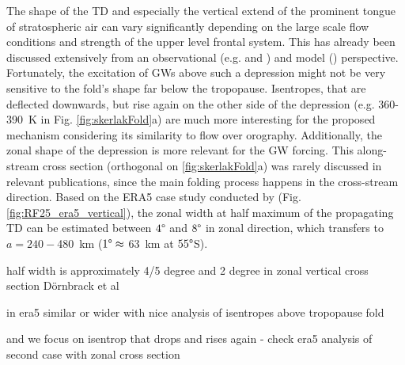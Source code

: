 The shape of the TD and especially the vertical extend of the prominent tongue of stratospheric air can vary significantly depending on the large scale flow conditions and strength of the upper level frontal system. This has already been discussed extensively from an observational (e.g. \cite{shapiro_further_1978} and \cite{keyser_review_1986}) and model (\cite{skerlak_tropopause_2015}) perspective. Fortunately, the excitation of GWs above such a depression might not be very sensitive to the fold's shape far below the tropopause. Isentropes, that are deflected downwards, but rise again on the other side of the depression (e.g. 360-\SI{390}{\kelvin} in Fig. \ref{fig:skerlakFold}a) are much more interesting for the proposed mechanism considering its similarity to flow over orography. Additionally, the zonal shape of the depression is more relevant for the GW forcing. This along-stream cross section (orthogonal on \ref{fig:skerlakFold}a) was rarely discussed in relevant publications, since the main folding process happens in the cross-stream direction. Based on the ERA5 case study conducted by \textcite{dornbrack_stratospheric_2022} (Fig. \ref{fig:RF25_era5_vertical}), the zonal width at half maximum of the propagating TD can be estimated between $4 \degree$ and $8 \degree$ in zonal direction, which transfers to $a=240-$\SI{480}{\kilo\meter}
($1\degree \approx$ \SI{63}{\kilo\meter} at $55 \degree$S). 

half width is approximately 4/5 degree and 2 degree in zonal vertical cross section Dörnbrack et al

in era5 similar or wider with nice analysis of isentropes above tropopause fold


and we focus on isentrop that drops and rises again - check era5 analysis of second case with zonal cross section





